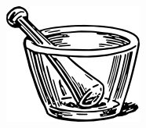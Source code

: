 \documentclass[11pt,letterpaper,notumble]{leaflet}
\begin{document}
    \begin{center}
    	\includegraphics[width=\textwidth]{../img/flask-sqlalchemy-logo.png}
    \end{center}

    \thispagestyle{empty}
    
    \newpage
    
\end{document}

